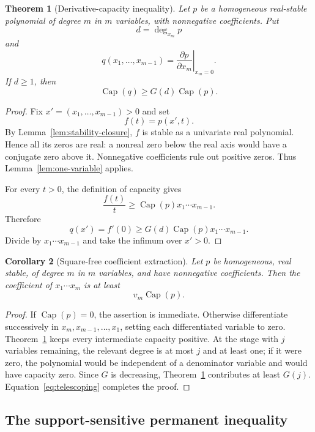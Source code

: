 \documentclass[11pt]{article}
\newtheorem{theorem}{Theorem}[section]
\newtheorem{corollary}[theorem]{Corollary}
\theoremstyle{definition}
\newcommand{\pcap}{\operatorname{Cap}}
\newcommand{\1}{\mathbf{1}}
\begin{document}
\begin{theorem}[Derivative-capacity inequality]\label{thm:derivative-capacity}
Let $p$ be a homogeneous real-stable polynomial of degree $m$ in $m$ variables, with nonnegative coefficients.  Put
\[
 d=\deg_{x_m}p
\]
and
\[
 q(x_1,\dots,x_{m-1})
 =\left.\frac{\partial p}{\partial x_m}\right|_{x_m=0}.
\]
If $d\ge1$, then
\[
 \pcap(q)\ge G(d)\pcap(p).
 \tag{3.3}\label{eq:derivative-capacity}
\]
\end{theorem}

\begin{proof}
Fix $x'=(x_1,\dots,x_{m-1})>0$ and set
\[
 f(t)=p(x',t).
\]
By Lemma~\ref{lem:stability-closure}, $f$ is stable as a univariate real polynomial.  Hence all its zeros are real: a nonreal zero below the real axis would have a conjugate zero above it.  Nonnegative coefficients rule out positive zeros.  Thus Lemma~\ref{lem:one-variable} applies.

For every $t>0$, the definition of capacity gives
\[
 \frac{f(t)}{t}\ge \pcap(p)x_1\cdots x_{m-1}.
\]
Therefore
\[
 q(x')=f'(0)
 \ge G(d)\pcap(p)x_1\cdots x_{m-1}.
\]
Divide by $x_1\cdots x_{m-1}$ and take the infimum over $x'>0$.
\end{proof}

\begin{corollary}[Square-free coefficient extraction]\label{cor:squarefree}
Let $p$ be homogeneous, real stable, of degree $m$ in $m$ variables, and have nonnegative coefficients.  Then the coefficient of $x_1\cdots x_m$ is at least
\[
 v_m\pcap(p).
\]
\end{corollary}

\begin{proof}
If $\pcap(p)=0$, the assertion is immediate.  Otherwise differentiate successively in $x_m,x_{m-1},\dots,x_1$, setting each differentiated variable to zero.  Theorem~\ref{thm:derivative-capacity} keeps every intermediate capacity positive.  At the stage with $j$ variables remaining, the relevant degree is at most $j$ and at least one; if it were zero, the polynomial would be independent of a denominator variable and would have capacity zero.  Since $G$ is decreasing, Theorem~\ref{thm:derivative-capacity} contributes at least $G(j)$.  Equation~\eqref{eq:telescoping} completes the proof.
\end{proof}

\subsection{The support-sensitive permanent inequality}
\end{document}
